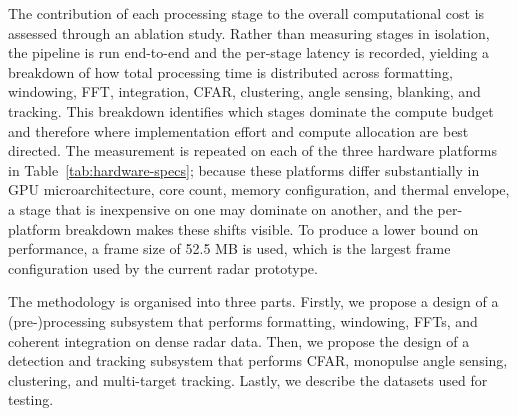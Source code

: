 The contribution of each processing stage to the overall computational cost is 
assessed through an ablation study. Rather than measuring stages in isolation, 
the pipeline is run end-to-end and the per-stage latency is recorded, yielding a 
breakdown of how total processing time is distributed across formatting, 
windowing, FFT, integration, CFAR, clustering, angle sensing, blanking, and 
tracking. This breakdown identifies which stages dominate the compute budget and 
therefore where implementation effort and compute allocation are best directed. 
The measurement is repeated on each of the three hardware platforms in 
Table~\ref{tab:hardware-specs}; because these platforms differ substantially in 
GPU microarchitecture, core count, memory configuration, and thermal envelope, a 
stage that is inexpensive on one may dominate on another, and the per-platform 
breakdown makes these shifts visible. To produce a lower bound on performance, a frame 
size of 52.5 MB is used, which is the largest frame configuration used by the current
radar prototype.   

The methodology is organised into three parts. Firstly, we propose a design of a \mbox{(pre-)processing} 
subsystem that performs formatting, windowing, FFTs, and coherent integration on dense radar data. 
Then, we propose the design of a detection and tracking subsystem that performs CFAR, monopulse angle 
sensing, clustering, and multi-target tracking. Lastly, we describe the datasets used for testing. 

\FloatBarrier


